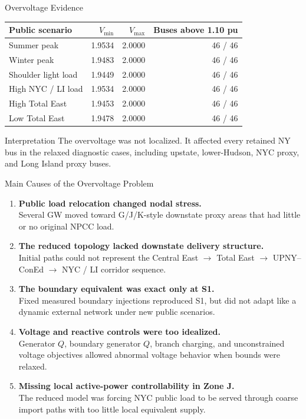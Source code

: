 \documentclass[aspectratio=169,10pt]{beamer}
\begin{document}
\begin{frame}{Overvoltage Evidence}
\scriptsize
\begin{tabularx}{\linewidth}{X r r r}
\toprule
\textbf{Public scenario} & \textbf{$V_{\min}$} & \textbf{$V_{\max}$} & \textbf{Buses above 1.10 pu} \\
\midrule
Summer peak & 1.9534 & 2.0000 & 46 / 46 \\
Winter peak & 1.9483 & 2.0000 & 46 / 46 \\
Shoulder light load & 1.9449 & 2.0000 & 46 / 46 \\
High NYC / LI load & 1.9534 & 2.0000 & 46 / 46 \\
High Total East & 1.9453 & 2.0000 & 46 / 46 \\
Low Total East & 1.9478 & 2.0000 & 46 / 46 \\
\bottomrule
\end{tabularx}

\vspace{0.9em}
\begin{block}{Interpretation}
The overvoltage was not localized. It affected every retained NY bus in the relaxed diagnostic cases, including upstate, lower-Hudson, NYC proxy, and Long Island proxy buses.
\end{block}
\end{frame}

\begin{frame}{Main Causes of the Overvoltage Problem}
\begin{enumerate}
  \item \textbf{Public load relocation changed nodal stress.}\\
  Several GW moved toward G/J/K-style downstate proxy areas that had little or no original NPCC load.

  \item \textbf{The reduced topology lacked downstate delivery structure.}\\
  Initial paths could not represent the Central East $\rightarrow$ Total East $\rightarrow$ UPNY--ConEd $\rightarrow$ NYC / LI corridor sequence.

  \item \textbf{The boundary equivalent was exact only at S1.}\\
  Fixed measured boundary injections reproduced S1, but did not adapt like a dynamic external network under new public scenarios.

  \item \textbf{Voltage and reactive controls were too idealized.}\\
  Generator $Q$, boundary generator $Q$, branch charging, and unconstrained voltage objectives allowed abnormal voltage behavior when bounds were relaxed.

  \item \textbf{Missing local active-power controllability in Zone J.}\\
  The reduced model was forcing NYC public load to be served through coarse import paths with too little local equivalent supply.
\end{enumerate}
\end{frame}
\end{document}
